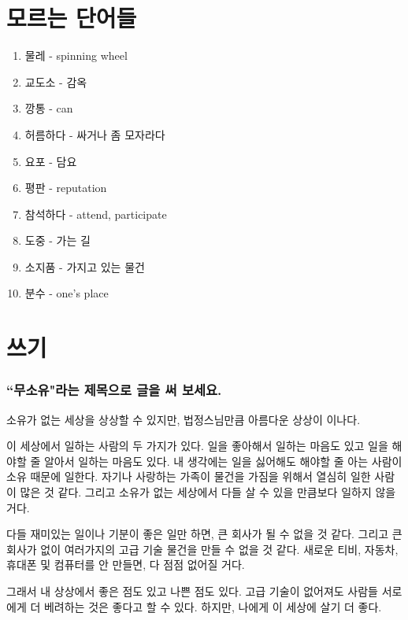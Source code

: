 \documentclass[11pt]{article}
\begin{document}
\section{모르는 단어들}
\begin{enumerate}
  \item 물레 - spinning wheel
  \item 교도소 - 감옥
  \item 깡통 - can
  \item 허름하다 - 싸거나 좀 모자라다
  \item 요포 - 담요
  \item 평판 - reputation
  \item 참석하다 - attend, participate
  \item 도중 - 가는 길
  \item 소지품 - 가지고 있는 물건
  \item 분수 - one's place
\end{enumerate}
\section{쓰기}
\doublespacing
\subsubsection*{``무소유"라는 제목으로 글을 써 보세요.}

소유가 없는 세상을 상상할 수 있지만, 법정스님만큼 아름다운 상상이 이나다.

이 세상에서 일하는 사람의 두 가지가 있다.  일을 좋아해서 일하는 마음도 있고
일을 해야할 줄 알아서 일하는 마음도 있다.  내 생각에는 일을 싫어해도 해야할 줄
아는 사람이 소유 때문에 일한다.  자기나 사랑하는 가족이 물건을 가짐을 위해서
열심히 일한 사람이 많은 것 같다.  그리고 소유가 없는 세상에서 다들 살 수 있을
만큼보다  일하지 않을 거다.

다들 재미있는 일이나 기분이 좋은 일만 하면, 큰 회사가 될 수 없을 것 같다.
그리고 큰 회사가 없이 여러가지의 고급 기술 물건을 만들 수 없을 것 같다.  새로운
티비, 자동차, 휴대폰 및 컴퓨터를 안 만들면, 다 점점 없어질 거다.


그래서 내 상상에서 좋은 점도 있고 나쁜 점도 있다.  고급 기술이 없어져도 사람들
서로에게 더 베려하는 것은 좋다고 할 수 있다.  하지만, 나에게 이 세상에 살기 더
좋다.
\end{document}
